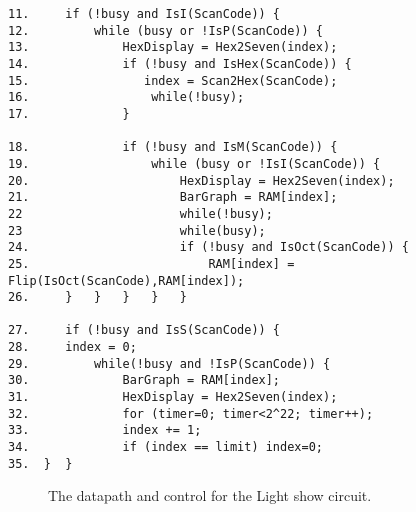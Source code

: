 \begin{description}
\begin{verbatim}
11.     if (!busy and IsI(ScanCode)) {
12.         while (busy or !IsP(ScanCode)) {
13.             HexDisplay = Hex2Seven(index);
14.             if (!busy and IsHex(ScanCode)) {
15.                index = Scan2Hex(ScanCode);
16.                 while(!busy);
17.             }

18.             if (!busy and IsM(ScanCode)) {
19.                 while (busy or !IsI(ScanCode)) {
20.                     HexDisplay = Hex2Seven(index);
21.                     BarGraph = RAM[index];
22             	        while(!busy);
23             	        while(busy);
24.                     if (!busy and IsOct(ScanCode)) {
25.                         RAM[index] = Flip(IsOct(ScanCode),RAM[index]);
26.     }   }   }   }   }

27.     if (!busy and IsS(ScanCode)) {
28.	    index = 0;
29.         while(!busy and !IsP(ScanCode)) {
30.             BarGraph = RAM[index];
31.             HexDisplay = Hex2Seven(index);
32.             for (timer=0; timer<2^22; timer++);
33.             index += 1;
34.             if (index == limit) index=0;
35.  }  }   
\end{verbatim}

\begin{landscape}
\begin{figure}[ht]
\caption{The datapath and control for the Light show circuit.}
\label{fig:LightShowCir}
\end{figure}



\end{landscape}
\end{description}
